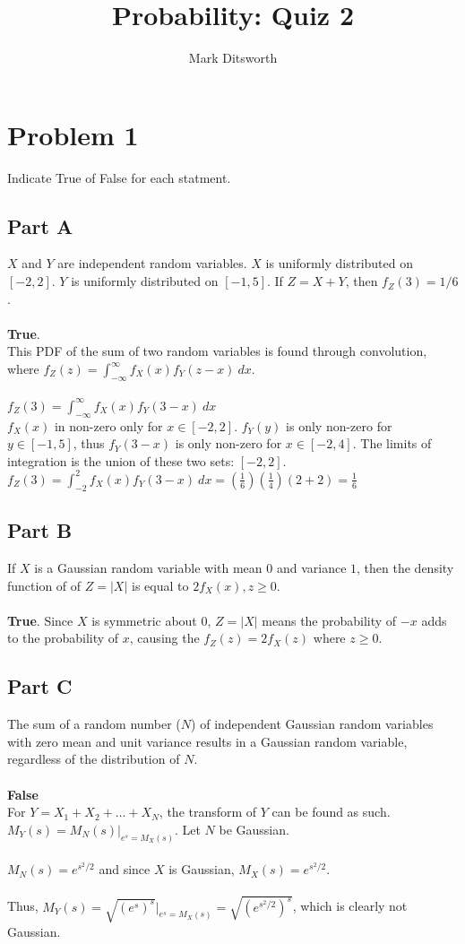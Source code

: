 \documentclass{amsart}
\title{Probability: Quiz 2}
\author{Mark Ditsworth}
\begin{document}
	\maketitle
	\section{Problem 1}	
	Indicate True of False for each statment.
	\subsection{Part A}
	$X$ and $Y$ are independent random variables. $X$ is uniformly distributed on $[-2,2]$. $Y$ is uniformly distributed on $[-1,5]$. If $Z=X+Y$, then $f_Z(3) = 1/6$.
	\\\\
	\textbf{True}.\\
	This PDF of the sum of two random variables is found through convolution, where $f_Z(z) = \int_{-\infty}^{\infty}f_X(x)f_Y(z-x)~dx$.\\\\
	$f_Z(3) = \int_{-\infty}^{\infty}f_X(x)f_Y(3-x)~dx$\\
	$f_X(x)$ in non-zero only for $x\in[-2,2]$. $f_Y(y)$ is only non-zero for $y\in [-1,5]$, thus $f_Y(3-x)$ is only non-zero for $x\in [-2,4]$. The limits of integration is the union of these two sets: $[-2,2]$.\\
	$f_Z(3) = \int_{-2}^{2}f_X(x)f_Y(3-x)~dx = \left(\frac{1}{6}\right)\left(\frac{1}{4}\right)\left(2+2\right) = \frac{1}{6}$\\
	\subsection{Part B}
	If $X$ is a Gaussian random variable with mean $0$ and variance $1$, then the density function of of $Z=|X|$ is equal to $2f_X(x),z\geq0$.\\
	\\
	\textbf{True}. Since $X$ is symmetric about $0$, $Z=|X|$ means the probability of $-x$ adds to the probability of $x$, causing the $f_Z(z) = 2f_X(z)$ where $z\geq0$.\\
	\subsection{Part C}
	The sum of a random number ($N$) of independent Gaussian random variables with zero mean and unit variance results in a Gaussian random variable, regardless of the distribution of $N$.\\
	\\
	\textbf{False}\\
	For $Y = X_1 + X_2 + \dots + X_N$, the transform of $Y$ can be found as such.\\
	$M_Y(s) = M_N(s)|_{e^s = M_X(s)}$. Let $N$ be Gaussian.\\
	\\
	$M_N(s) = e^{s^2/2}$ and since $X$ is Gaussian, $M_X(s) = e^{s^2/2}$.\\
	\\
	Thus, $M_Y(s) = \sqrt{(e^s)^s}|_{e^s=M_X(s)} = \sqrt{(e^{s^2/2})^s}$, which is clearly not Gaussian.\\
\end{document}

